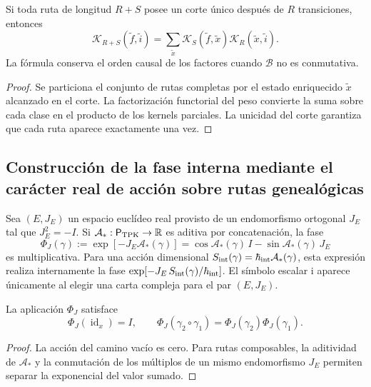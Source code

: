 \begin{proposition}
\label{prop:composicion-kernel-enriquecido-rev2}
Si toda ruta de longitud \(R+S\) posee un corte único después de \(R\)
transiciones, entonces
\[
 \mathcal K_{R+S}(\widetilde f,\widetilde i)
 =\sum_{\widetilde x}
 \mathcal K_S(\widetilde f,\widetilde x)
 \mathcal K_R(\widetilde x,\widetilde i).
\]
La fórmula conserva el orden causal de los factores cuando \(\mathcal B\) no
es conmutativa.
\end{proposition}

\begin{proof}
Se particiona el conjunto de rutas completas por el estado enriquecido
\(\widetilde x\) alcanzado en el corte. La factorización functorial del peso
convierte la suma sobre cada clase en el producto de los kernels parciales.
La unicidad del corte garantiza que cada ruta aparece exactamente una vez.
\end{proof}

\subsection{Construcción de la fase interna mediante el carácter real de acción sobre rutas genealógicas}

Sea \((E,J_E)\) un espacio euclídeo real provisto de un endomorfismo
ortogonal \(J_E\) tal que \(J_E^2=-I\). Si
\(\mathcal A_*:\mathsf P_{\rm TPK}\to\mathbb R\) es aditiva por
concatenación, la fase
\begin{equation}
 \Phi_J(\gamma)
 :=\exp[-J_E\mathcal A_*(\gamma)]
 =\cos\mathcal A_*(\gamma)\,I
  -\sin\mathcal A_*(\gamma)\,J_E
 \label{eq:fase-interna-caminos-rev2}
\end{equation}
es multiplicativa. Para una acción dimensional
\(S_{\rm int}(\gamma)=\hbar_{\rm int}\mathcal A_*(\gamma)\), esta
expresión realiza internamente la fase
\(\exp[-J_E\,S_{\rm int}(\gamma)/\hbar_{\rm int}]\). El símbolo escalar
\(\mathrm i\) aparece únicamente al elegir una carta compleja para el par
\((E,J_E)\).

\begin{proposition}
\label{prop:fase-interna-functor-rev2}
La aplicación \(\Phi_J\) satisface
\[
 \Phi_J(\operatorname{id}_x)=I,
 \qquad
 \Phi_J(\gamma_2\circ\gamma_1)
 =\Phi_J(\gamma_2)\Phi_J(\gamma_1).
\]
\end{proposition}

\begin{proof}
La acción del camino vacío es cero. Para rutas composables, la aditividad de
\(\mathcal A_*\) y la conmutación de los múltiplos de un mismo endomorfismo
\(J_E\) permiten separar la exponencial del valor sumado.
\end{proof}

